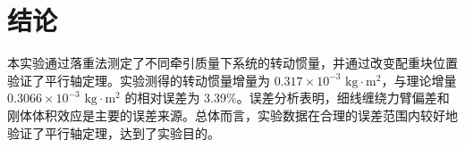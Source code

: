 \documentclass[11pt, a4paper, twocolumn]{article}
\begin{document}
	\section{结论}
	本实验通过落重法测定了不同牵引质量下系统的转动惯量，并通过改变配重块位置验证了平行轴定理。实验测得的转动惯量增量为 $0.317 \times 10^{-3}\text{ kg}\cdot\text{m}^2$，与理论增量 $0.3066 \times 10^{-3}\text{ kg}\cdot\text{m}^2$ 的相对误差为 3.39\%。误差分析表明，细线缠绕力臂偏差和刚体体积效应是主要的误差来源。总体而言，实验数据在合理的误差范围内较好地验证了平行轴定理，达到了实验目的。
	
\end{document}
